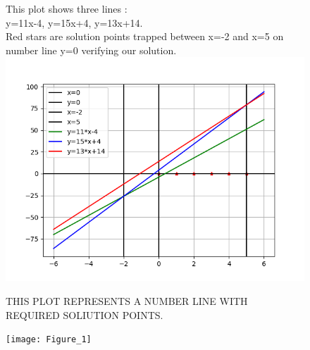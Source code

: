\documentclass[12pt,two column]{article}
\begin{document}
\begin{figure}

This plot shows three lines :\\
y=11x-4,
y=15x+4,
y=13x+14.
\\Red stars are solution points trapped between x=-2 and x=5 on number line y=0 verifying our solution.
\includegraphics[scale=0.5]{figure_2.png}
\end{figure}

\begin{figure}
THIS PLOT REPRESENTS A NUMBER LINE WITH REQUIRED SOLIUTION POINTS.

\texttt{[image: Figure\_1]}
\end{figure}
\end{document}
